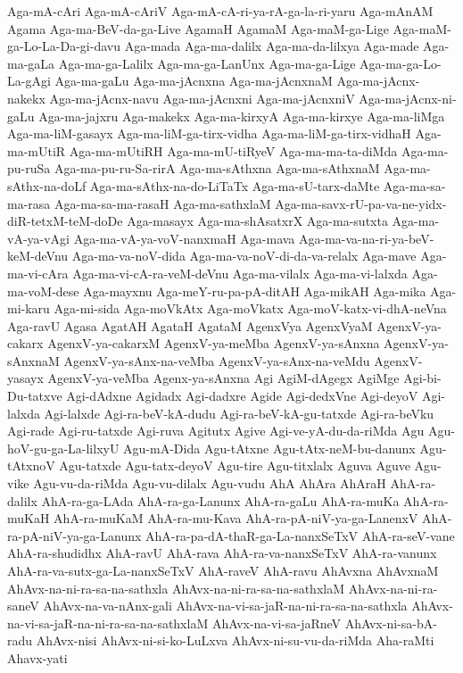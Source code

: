 {Aga-mA-cAri
Aga-mA-cAriV
Aga-mA-cA-ri-ya-rA-ga-la-ri-yaru
Aga-mAnAM
Agama
Aga-ma-BeV-da-ga-Live
AgamaH
AgamaM
Aga-maM-ga-Lige
Aga-maM-ga-Lo-La-Da-gi-davu
Aga-mada
Aga-ma-dalilx
Aga-ma-da-lilxya
Aga-made
Aga-ma-gaLa
Aga-ma-ga-Lalilx
Aga-ma-ga-LanUnx
Aga-ma-ga-Lige
Aga-ma-ga-Lo-La-gAgi
Aga-ma-gaLu
Aga-ma-jAcnxna
Aga-ma-jAcnxnaM
Aga-ma-jAcnx-nakekx
Aga-ma-jAcnx-navu
Aga-ma-jAcnxni
Aga-ma-jAcnxniV
Aga-ma-jAcnx-ni-gaLu
Aga-ma-jajxru
Aga-makekx
Aga-ma-kirxyA
Aga-ma-kirxye
Aga-ma-liMga
Aga-ma-liM-gasayx
Aga-ma-liM-ga-tirx-vidha
Aga-ma-liM-ga-tirx-vidhaH
Aga-ma-mUtiR
Aga-ma-mUtiRH
Aga-ma-mU-tiRyeV
Aga-ma-ma-ta-diMda
Aga-ma-pu-ruSa
Aga-ma-pu-ru-Sa-rirA
Aga-ma-sAthxna
Aga-ma-sAthxnaM
Aga-ma-sAthx-na-doLf
Aga-ma-sAthx-na-do-LiTaTx
Aga-ma-sU-tarx-daMte
Aga-ma-sa-ma-rasa
Aga-ma-sa-ma-rasaH
Aga-ma-sathxlaM
Aga-ma-savx-rU-pa-va-ne-yidx-diR-tetxM-teM-doDe
Aga-masayx
Aga-ma-shAsatxrX
Aga-ma-sutxta
Aga-ma-vA-ya-vAgi
Aga-ma-vA-ya-voV-nanxmaH
Aga-mava
Aga-ma-va-na-ri-ya-beV-keM-deVnu
Aga-ma-va-noV-dida
Aga-ma-va-noV-di-da-va-relalx
Aga-mave
Aga-ma-vi-cAra
Aga-ma-vi-cA-ra-veM-deVnu
Aga-ma-vilalx
Aga-ma-vi-lalxda
Aga-ma-voM-dese
Aga-mayxnu
Aga-meY-ru-pa-pA-ditAH
Aga-mikAH
Aga-mika
Aga-mi-karu
Aga-mi-sida
Aga-moVkAtx
Aga-moVkatx
Aga-moV-katx-vi-dhA-neVna
Aga-ravU
Agasa
AgatAH
AgataH
AgataM
AgenxVya
AgenxVyaM
AgenxV-ya-cakarx
AgenxV-ya-cakarxM
AgenxV-ya-meMba
AgenxV-ya-sAnxna
AgenxV-ya-sAnxnaM
AgenxV-ya-sAnx-na-veMba
AgenxV-ya-sAnx-na-veMdu
AgenxV-yasayx
AgenxV-ya-veMba
Agenx-ya-sAnxna
Agi
AgiM-dAgegx
AgiMge
Agi-bi-Du-tatxve
Agi-dAdxne
Agidadx
Agi-dadxre
Agide
Agi-dedxVne
Agi-deyoV
Agi-lalxda
Agi-lalxde
Agi-ra-beV-kA-dudu
Agi-ra-beV-kA-gu-tatxde
Agi-ra-beVku
Agi-rade
Agi-ru-tatxde
Agi-ruva
Agitutx
Agive
Agi-ve-yA-du-da-riMda
Agu
Agu-hoV-gu-ga-La-lilxyU
Agu-mA-Dida
Agu-tAtxne
Agu-tAtx-neM-bu-danunx
Agu-tAtxnoV
Agu-tatxde
Agu-tatx-deyoV
Agu-tire
Agu-titxlalx
Aguva
Aguve
Agu-vike
Agu-vu-da-riMda
Agu-vu-dilalx
Agu-vudu
AhA
AhAra
AhAraH
AhA-ra-dalilx
AhA-ra-ga-LAda
AhA-ra-ga-Lanunx
AhA-ra-gaLu
AhA-ra-muKa
AhA-ra-muKaH
AhA-ra-muKaM
AhA-ra-mu-Kava
AhA-ra-pA-niV-ya-ga-LanenxV
AhA-ra-pA-niV-ya-ga-Lanunx
AhA-ra-pa-dA-thaR-ga-La-nanxSeTxV
AhA-ra-seV-vane
AhA-ra-shudidhx
AhA-ravU
AhA-rava
AhA-ra-va-nanxSeTxV
AhA-ra-vanunx
AhA-ra-va-sutx-ga-La-nanxSeTxV
AhA-raveV
AhA-ravu
AhAvxna
AhAvxnaM
AhAvx-na-ni-ra-sa-na-sathxla
AhAvx-na-ni-ra-sa-na-sathxlaM
AhAvx-na-ni-ra-saneV
AhAvx-na-va-nAnx-gali
AhAvx-na-vi-sa-jaR-na-ni-ra-sa-na-sathxla
AhAvx-na-vi-sa-jaR-na-ni-ra-sa-na-sathxlaM
AhAvx-na-vi-sa-jaRneV
AhAvx-ni-sa-bA-radu
AhAvx-nisi
AhAvx-ni-si-ko-LuLxva
AhAvx-ni-su-vu-da-riMda
Aha-raMti
Ahavx-yati
}
